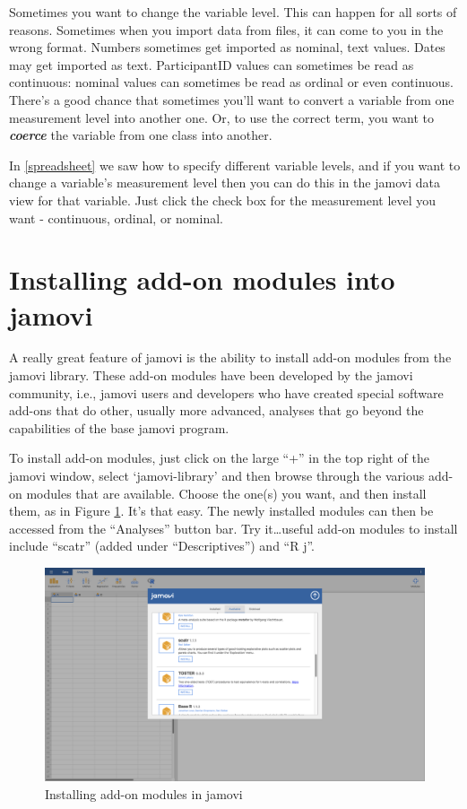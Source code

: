 \documentclass[
]{book}
\begin{document}
Sometimes you want to change the variable level. This can happen for all sorts of reasons. Sometimes when you import data from files, it can come to you in the wrong format. Numbers sometimes get imported as nominal, text values. Dates may get imported as text. ParticipantID values can sometimes be read as continuous: nominal values can sometimes be read as ordinal or even continuous. There's a good chance that sometimes you'll want to convert a variable from one measurement level into another one. Or, to use the correct term, you want to \textbf{\emph{coerce}} the variable from one class into another.

In \ref{spreadsheet} we saw how to specify different variable levels, and if you want to change a variable's measurement level then you can do this in the jamovi data view for that variable. Just click the check box for the measurement level you want - continuous, ordinal, or nominal.

\hypertarget{jamovimodules}{%
\section{Installing add-on modules into jamovi}\label{jamovimodules}}

A really great feature of jamovi is the ability to install add-on modules from the jamovi library. These add-on modules have been developed by the jamovi community, i.e., jamovi users and developers who have created special software add-ons that do other, usually more advanced, analyses that go beyond the capabilities of the base jamovi program.

To install add-on modules, just click on the large ``+'' in the top right of the jamovi window, select `jamovi-library' and then browse through the various add-on modules that are available. Choose the one(s) you want, and then install them, as in Figure \ref{fig:modules}. It's that easy. The newly installed modules can then be accessed from the ``Analyses'' button bar. Try it\ldots useful add-on modules to install include ``scatr'' (added under ``Descriptives'') and ``R j''.

\begin{figure}
\includegraphics[width=26.67in]{img/graphics/modules} \caption{Installing add-on modules in jamovi}\label{fig:modules}
\end{figure}
\end{document}

